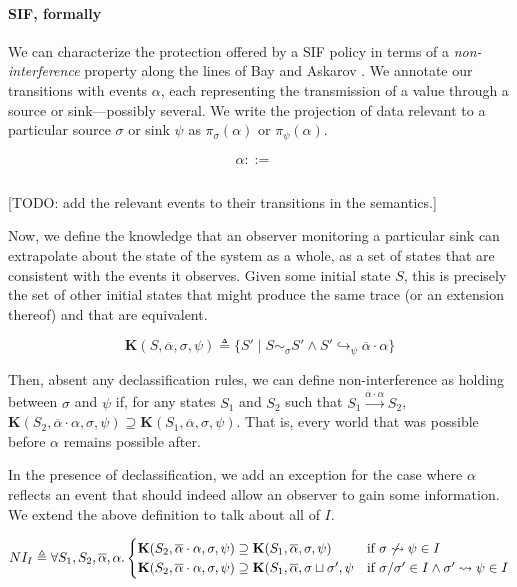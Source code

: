 \documentclass[acmsmall,review,anonymous]{acmart}\settopmatter{printfolios=true,printccs=false,printacmref=false}
\begin{document}
\paragraph{SIF, formally}

We can characterize the protection offered by a SIF policy in terms of a {\em non-interference}
property along the lines of Bay and Askarov \cite{}. We annotate our transitions with events \(\alpha\),
each representing the transmission of a value through a source or sink---possibly several. We write the
projection of data relevant to a particular source \(\sigma\) or sink \(\psi\) as \(\pi_\sigma(\alpha)\)
or \(\pi_\psi(\alpha)\).

\[\begin{aligned}
\alpha ::= & \\
& \\
\end{aligned}\]

[TODO: add the relevant events to their transitions in the semantics.]

Now, we define the knowledge that an observer monitoring a particular sink can extrapolate about the
state of the system as a whole, as a set of states that are consistent with the events it observes.
Given some initial state \(S\), this is precisely the set of other initial states that might
produce the same trace (or an extension thereof) and that are equivalent.

\[\mathbf{K}(S,\overline{\alpha},\sigma,\psi) \triangleq
\{S' \mid S \sim_\sigma S' \land S' \hookrightarrow_{\psi} \overline{\alpha} \cdot \alpha\}\]

Then, absent any declassification rules, we can define non-interference as holding between
\(\sigma\) and \(\psi\) if, for any states \(S_1\) and \(S_2\) such that
\(S_1 \xrightarrow{\overline{\alpha}\cdot \alpha} S_2\),
\(\mathbf{K}(S_2,\overline{\alpha}\cdot \alpha,\sigma,\psi) \supseteq
\mathbf{K}(S_1,\overline{\alpha},\sigma,\psi)\). That is, every world that was possible before
\(\alpha\) remains possible after.

In the presence of declassification, we add an exception for the case where \(\alpha\)
reflects an event that should indeed allow an observer to gain some information. We extend
the above definition to talk about all of \(I\).

\[NI_I \triangleq \forall S_1, S_2, \overline{\alpha}, \alpha .
\begin{cases}
\mathbf{K}(S_2,\overline{\alpha}\cdot \alpha,\sigma,\psi) \supseteq
\mathbf{K}(S_1,\overline{\alpha},\sigma,\psi) &
\textnormal{if } \sigma \not \rightsquigarrow \psi \in I \\
\mathbf{K}(S_2,\overline{\alpha}\cdot \alpha,\sigma,\psi) \supseteq
\mathbf{K}(S_1,\overline{\alpha},\sigma \sqcup \sigma',\psi &
\textnormal{if } \sigma / \sigma' \in I \land \sigma' \rightsquigarrow \psi \in I \\
\end{cases}\]
\end{document}
